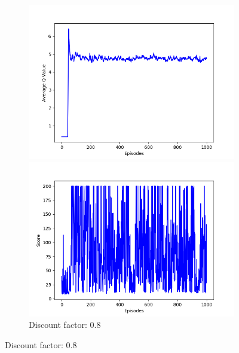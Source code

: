 \documentclass{article}
\begin{document}
\begin{figure}[!htbp]
  \centering
  \begin{subfigure}{\textwidth}
    \begin{minipage}{0.5\textwidth}
      \centering
      \includegraphics[scale=0.45]{../experiments/discount_factor_08/qvalues.png}
    \end{minipage}
    \begin{minipage}{0.5\textwidth}
      \centering
      \includegraphics[scale=0.45]{../experiments/discount_factor_08/scores.png}
    \end{minipage}
    \caption{Discount factor: 0.8}
  \end{subfigure}%


\end{figure}
\end{document}
